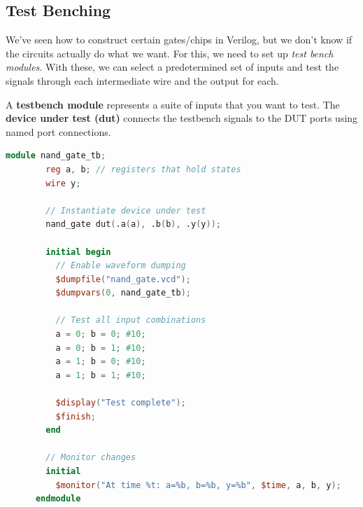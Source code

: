 \subsection{Test Benching}

  We've seen how to construct certain gates/chips in Verilog, but we don't know if the circuits actually do what we want. For this, we need to set up \textit{test bench modules}. With these, we can select a predetermined set of inputs and test the signals through each intermediate wire and the output for each. 

  \begin{definition}
    \label{def:test-bench-module}
    A \textbf{testbench module} represents a suite of inputs that you want to test. The \textbf{device under test (dut)} connects the testbench signals to the DUT ports using named port connections. 

    \begin{lstlisting}[language=Verilog]
      module nand_gate_tb;
        reg a, b; // registers that hold states
        wire y;

        // Instantiate device under test
        nand_gate dut(.a(a), .b(b), .y(y));

        initial begin
          // Enable waveform dumping
          $dumpfile("nand_gate.vcd");
          $dumpvars(0, nand_gate_tb);

          // Test all input combinations
          a = 0; b = 0; #10;
          a = 0; b = 1; #10;
          a = 1; b = 0; #10;
          a = 1; b = 1; #10;

          $display("Test complete");
          $finish;
        end

        // Monitor changes
        initial
          $monitor("At time %t: a=%b, b=%b, y=%b", $time, a, b, y);
      endmodule
    \end{lstlisting}
  \end{definition}

